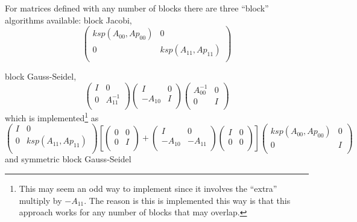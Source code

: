 For matrices defined with any number of blocks there are three ``block'' algorithms available: block Jacobi,
\[
\left( \begin{array}{cc}
ksp(A_{00},Ap_{00})   & 0 \\
0   & ksp(A_{11},Ap_{11}) \\
\end{array} \right)
\]

block Gauss-Seidel,
\[
\left( \begin{array}{cc}
I   & 0 \\
0 & A^{-1}_{11} \\
\end{array} \right)
\left( \begin{array}{cc}
I   & 0 \\
-A_{10} & I \\
\end{array} \right)
\left( \begin{array}{cc}
A^{-1}_{00}   & 0 \\
0 & I \\
\end{array} \right)
\]
which is implemented\footnote{This may seem an odd way to implement since it involves the ``extra'' multiply by $ -A_{11}$. The reason is this is implemented this way is that this approach works for any number of blocks that may overlap.} as
\[
\left( \begin{array}{cc}
I   & 0 \\
0 & ksp(A_{11},Ap_{11}) \\
\end{array} \right)
\left[
\left( \begin{array}{cc}
0   & 0 \\
0 & I \\
\end{array} \right)
+
\left( \begin{array}{cc}
I   & 0 \\
-A_{10} & -A_{11} \\
\end{array} \right)
\left( \begin{array}{cc}
I   & 0 \\
0 & 0 \\
\end{array} \right)
\right]
\left( \begin{array}{cc}
ksp(A_{00},Ap_{00})   & 0 \\
0 & I \\
\end{array} \right)
\]
 and symmetric block Gauss-Seidel

